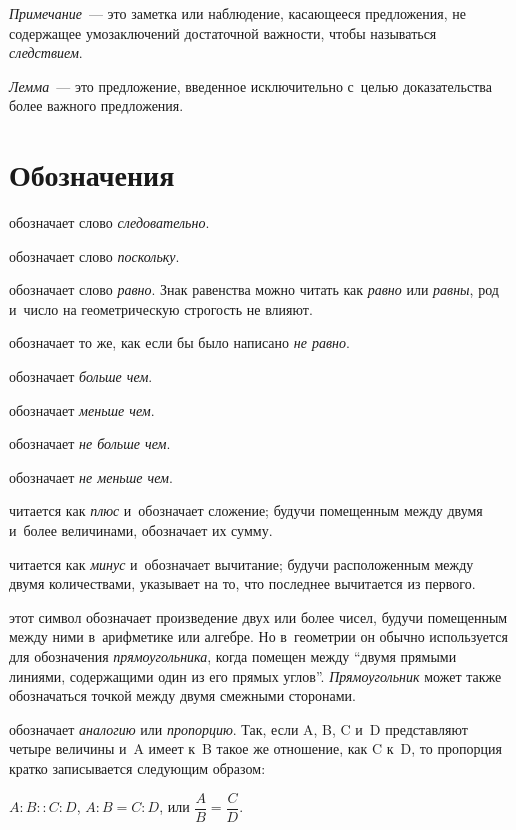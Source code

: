\documentclass[letters,booklanguage=russian]{byrnebook}
\begin{document}
\emph{Примечание}~— это заметка или наблюдение, касающееся предложения, не содержащее умозаключений достаточной важности, чтобы называться \emph{следствием}.

\emph{Лемма}~— это предложение, введенное исключительно с~целью доказательства более важного предложения.

\vfill\pagebreak

\chapter*{Обозначения}

\symb{$\therefore$}
 обозначает слово \emph{следовательно}.

\symb{$\because$}
 обозначает слово \emph{поскольку}.

\symb{$=$}
 обозначает слово \emph{равно}. Знак равенства можно читать как \emph{равно} или \emph{равны}, род и~число на геометрическую строгость не влияют.

\symb{$\neq$}
 обозначает то же, как если бы было написано \emph{не равно}.

\symb{$>$}
 обозначает \emph{больше чем}.

\symb{$<$}
 обозначает \emph{меньше чем}.

\symb{$\ngtr$}
 обозначает \emph{не больше чем}.

\symb{$\nless$}
 обозначает \emph{не меньше чем}.

\symb{$+$}
 читается как \emph{плюс} и~обозначает сложение; будучи помещенным между двумя и~более величинами, обозначает их сумму.

\symb{$-$}
 читается как \emph{минус} и~обозначает вычитание; будучи расположенным между двумя количествами, указывает на то, что последнее вычитается из первого.

\symb{$\times$}
 этот символ обозначает произведение двух или более чисел, будучи помещенным между ними в~арифметике или алгебре. Но в~геометрии он обычно используется для обозначения \emph{прямоугольника}, когда помещен между \enquote{двумя прямыми линиями, содержащими один из его прямых углов}. \emph{Прямоугольник} может также обозначаться точкой между двумя смежными сторонами.

\symb{$:\ ::\ :$}
 обозначает \emph{аналогию} или \emph{пропорцию}. Так, если A, B, C и~D представляют четыре величины и~A имеет к~B такое же отношение, как C к~D, то пропорция кратко записывается следующим образом:

$A : B :: C : D$, $A : B = C : D$, или $\dfrac{A}{B} = \dfrac{C}{D}$.
\end{document}
